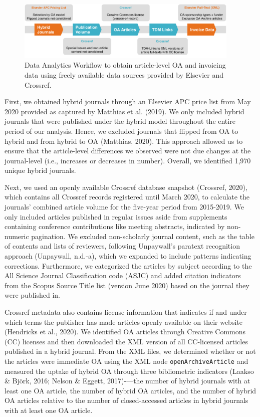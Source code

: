 \documentclass[a4paper,man,floatsintext,longtable,noextraspace,12pt]{apa6}
\begin{document}
\begin{figure}[H]

{\centering \includegraphics[width=0.95\textwidth]{../figure/els_flow.pdf}

}

\caption{Data Analytics Workflow to obtain article-level OA and invoicing data using freely available data sources provided by Elsevier and Crossref.
}\label{fig:workflow}
\end{figure}

First, we obtained hybrid journals through an Elsevier APC price list
from May 2020 provided as captured by Matthias et al. (2019). We only
included hybrid journals that were published under the hybrid model
throughout the entire period of our analysis. Hence, we excluded
journals that flipped from OA to hybrid and from hybrid to OA (Matthias,
2020). This approach allowed us to ensure that the article-level
differences we observed were not due changes at the journal-level (i.e.,
increases or decreases in number). Overall, we identified 1,970 unique
hybrid journals.

Next, we used an openly available Crossref database snapshot (Crossref,
2020), which contains all Crossref records registered until March 2020,
to calculate the journals' combined article volume for the five-year
period from 2015-2019. We only included articles published in regular
issues aside from supplements containing conference contributions like
meeting abstracts, indicated by non-numeric pagination. We excluded
non-scholarly journal content, such as the table of contents and lists
of reviewers, following Unpaywall's paratext recognition approach
(Unpaywall, n.d.-a), which we expanded to include patterns indicating
corrections. Furthermore, we categorized the articles by subject
according to the All Science Journal Classification code (ASJC) and
added citation indicators from the Scopus Source Title list (version
June 2020) based on the journal they were published in.

Crossref metadata also contains license information that indicates if
and under which terms the publisher has made articles openly available
on their website (Hendricks et al., 2020). We identified OA articles
through Creative Commons (CC) licenses and then downloaded the XML
version of all CC-licensed articles published in a hybrid journal. From
the XML files, we determined whether or not the articles were immediate
OA using the XML node \texttt{openArchiveArticle} and measured the
uptake of hybrid OA through three bibliometric indicators (Laakso \&
Björk, 2016; Nelson \& Eggett, 2017)-\/---the number of hybrid journals
with at least one OA article, the number of hybrid OA articles, and the
number of hybrid OA articles relative to the number of closed-accessed
articles in hybrid journals with at least one OA article.
\end{document}
